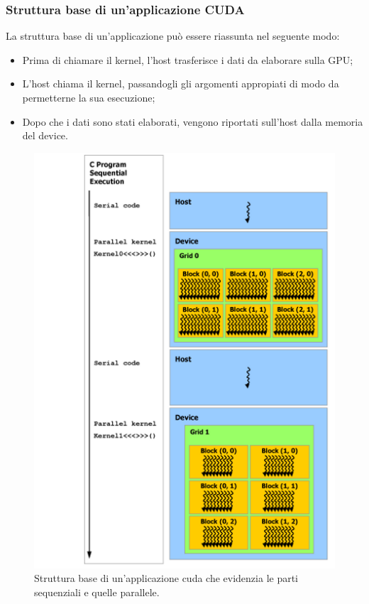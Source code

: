 \subsubsection{Struttura base di un'applicazione CUDA}
\noindent La struttura base di un'applicazione può essere riassunta nel seguente modo:
\begin{itemize}
    \item Prima di chiamare il kernel, l'host trasferisce i dati da elaborare sulla GPU;
    \item L'host chiama il kernel, passandogli gli argomenti appropiati di modo da permetterne la sua esecuzione;
    \item Dopo che i dati sono stati elaborati, vengono riportati sull'host dalla memoria del device.
\end{itemize}
\begin{figure}[h!]
    \centering
    \includegraphics[scale=0.56]{img/heterogeneous-programming.png}
    \caption{Struttura base di un'applicazione cuda che evidenzia le parti sequenziali e quelle parallele.}
    \label{fig:hetero_programming}
\end{figure}

